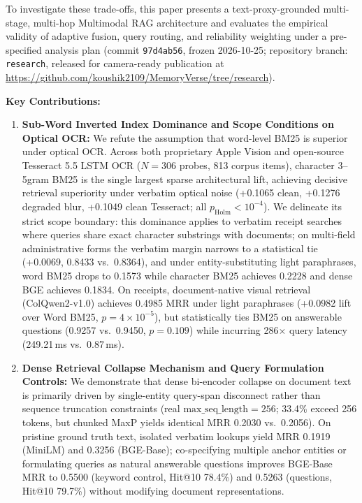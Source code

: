 \documentclass[conference]{IEEEtran}
\begin{document}
To investigate these trade-offs, this paper presents a text-proxy-grounded multi-stage, multi-hop Multimodal RAG architecture and evaluates the empirical validity of adaptive fusion, query routing, and reliability weighting under a pre-specified analysis plan (commit \texttt{97d4ab56}, frozen 2026-10-25; repository branch: \texttt{research}, released for camera-ready publication at \url{https://github.com/koushik2109/MemoryVerse/tree/research}).

\textbf{Key Contributions:}
\begin{enumerate}
    \setlength{\itemsep}{1pt plus 0.5pt}
    \setlength{\parskip}{0pt}
    \item \textbf{Sub-Word Inverted Index Dominance and Scope Conditions on Optical OCR:} We refute the assumption that word-level BM25 is superior under optical OCR. Across both proprietary Apple Vision and open-source Tesseract 5.5 LSTM OCR ($N=306$ probes, 813 corpus items), character 3--5gram BM25 is the single largest sparse architectural lift, achieving decisive retrieval superiority under verbatim optical noise (+0.1065 clean, +0.1276 degraded blur, +0.1049 clean Tesseract; all $p_{\text{Holm}} < 10^{-4}$). We delineate its strict scope boundary: this dominance applies to verbatim receipt searches where queries share exact character substrings with documents; on multi-field administrative forms the verbatim margin narrows to a statistical tie (+0.0069, 0.8433 vs.\ 0.8364), and under entity-substituting light paraphrases, word BM25 drops to 0.1573 while character BM25 achieves 0.2228 and dense BGE achieves 0.1834. On receipts, document-native visual retrieval (ColQwen2-v1.0) achieves 0.4985 MRR under light paraphrases (+0.0982 lift over Word BM25, $p = 4 \times 10^{-5}$), but statistically ties BM25 on answerable questions (0.9257 vs.\ 0.9450, $p = 0.109$) while incurring 286$\times$ query latency (249.21\,ms vs.\ 0.87\,ms).
    \item \textbf{Dense Retrieval Collapse Mechanism and Query Formulation Controls:} We demonstrate that dense bi-encoder collapse on document text is primarily driven by single-entity query-span disconnect rather than sequence truncation constraints (real $\text{max\_seq\_length}=256$; 33.4\% exceed 256 tokens, but chunked MaxP yields identical MRR 0.2030 vs.\ 0.2056). On pristine ground truth text, isolated verbatim lookups yield MRR 0.1919 (MiniLM) and 0.3256 (BGE-Base); co-specifying multiple anchor entities or formulating queries as natural answerable questions improves BGE-Base MRR to 0.5500 (keyword control, Hit@10 78.4\%) and 0.5263 (questions, Hit@10 79.7\%) without modifying document representations.

\end{enumerate}
\end{document}
